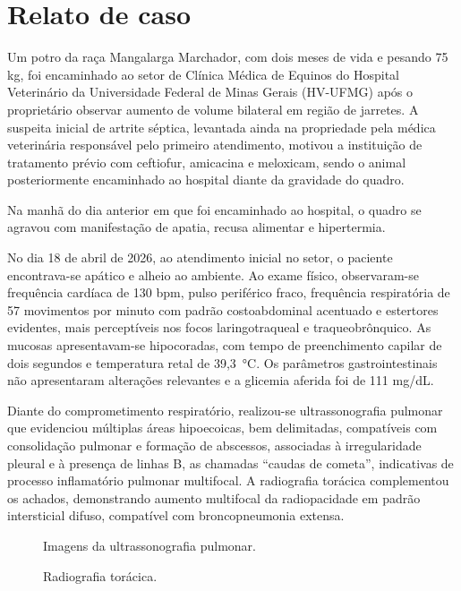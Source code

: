 \section{Relato de caso}
\label{sec:relato}

Um potro da raça Mangalarga Marchador, com dois meses de vida e pesando
75 kg, foi encaminhado ao setor de Clínica Médica de Equinos do Hospital
Veterinário da Universidade Federal de Minas Gerais (HV-UFMG) após o
proprietário observar aumento de volume bilateral em região de jarretes.
A suspeita inicial de artrite séptica, levantada ainda na propriedade
pela médica veterinária responsável pelo primeiro atendimento, motivou a
instituição de tratamento prévio com ceftiofur, amicacina e meloxicam,
sendo o animal posteriormente encaminhado ao hospital diante da
gravidade do quadro.

Na manhã do dia anterior em que foi encaminhado ao hospital, o quadro se
agravou com manifestação de apatia, recusa alimentar e hipertermia.

No dia 18 de abril de 2026, ao atendimento inicial no setor, o paciente
encontrava-se apático e alheio ao ambiente. Ao exame físico,
observaram-se frequência cardíaca de 130 bpm, pulso periférico fraco,
frequência respiratória de 57 movimentos por minuto com padrão
costoabdominal acentuado e estertores evidentes, mais perceptíveis nos
focos laringotraqueal e traqueobrônquico. As mucosas apresentavam-se
hipocoradas, com tempo de preenchimento capilar de dois segundos e
temperatura retal de 39,3~°C. Os parâmetros gastrointestinais não
apresentaram alterações relevantes e a glicemia aferida foi de 111
mg/dL.

Diante do comprometimento respiratório, realizou-se ultrassonografia
pulmonar que evidenciou múltiplas áreas hipoecoicas, bem delimitadas,
compatíveis com consolidação pulmonar e formação de abscessos,
associadas à irregularidade pleural e à presença de linhas B, as
chamadas ``caudas de cometa'', indicativas de processo inflamatório
pulmonar multifocal. A radiografia torácica complementou os achados,
demonstrando aumento multifocal da radiopacidade em padrão intersticial
difuso, compatível com broncopneumonia extensa.

\begin{figure}[htb]
  \centering
  \caption{Imagens da ultrassonografia pulmonar.}
  \label{fig:usg-pulmonar}
\end{figure}

\begin{figure}[htb]
  \centering
  \caption{Radiografia torácica.}
  \label{fig:rx-toracica}
\end{figure}

